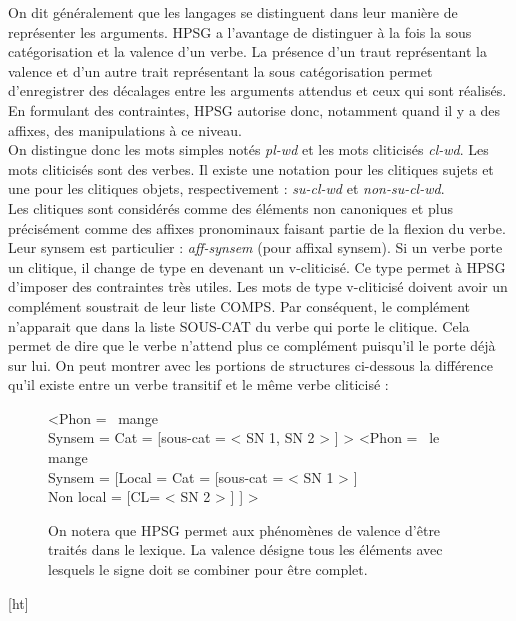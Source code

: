 	On dit généralement que les langages se distinguent dans leur manière de représenter les arguments. HPSG a l'avantage de
	distinguer à la fois la sous catégorisation et la valence d'un verbe. La présence d'un traut représentant la valence
	et d'un autre trait représentant la sous catégorisation permet d'enregistrer des décalages entre les arguments attendus et
	ceux qui sont réalisés.	En formulant des contraintes, HPSG autorise donc, notamment quand il y a des affixes,
	des manipulations à ce niveau.
	\\
	On distingue donc les mots simples notés \emph{pl-wd} et les mots cliticisés \emph{cl-wd}. Les mots cliticisés sont des
	verbes. Il existe une notation pour les clitiques sujets et une pour les clitiques objets, respectivement : \emph{su-cl-wd}
	et \emph{non-su-cl-wd}.
	\\
	Les clitiques sont considérés comme des éléments non canoniques et plus précisément comme des affixes pronominaux faisant
	partie de la flexion du verbe. Leur synsem est particulier : \emph{aff-synsem} (pour affixal synsem). Si un verbe porte
	un clitique, il change de type en devenant un v-cliticisé. Ce type permet à HPSG d'imposer des contraintes très utiles.
	Les mots de type v-cliticisé doivent avoir un complément soustrait de leur liste COMPS. Par conséquent, le complément
	n'apparait que dans la liste SOUS-CAT du verbe qui porte le clitique. Cela permet de dire que le verbe n'attend plus ce
	complément puisqu'il le porte déjà sur lui. On peut montrer avec les portions de structures ci-dessous la différence
	qu'il existe entre un verbe transitif et le même verbe cliticisé :
	\\
\begin{figure}[ht]
\begin{avm}

			<Phon = \ mange \ \\
			Synsem = Cat = [sous-cat = < SN {1}, SN {2} > ] >
			<Phon = \ le mange \ \\
			Synsem = [Local = Cat = [sous-cat = < SN {1} > ] \\
					  Non local = [CL= < SN {2} > ] ] >

\end{avm}
\caption{On notera que HPSG permet aux phénomènes de valence d'être traités dans le lexique. La valence désigne tous les
éléments avec lesquels le signe doit se combiner pour être complet.}
\end{figure}[ht]

